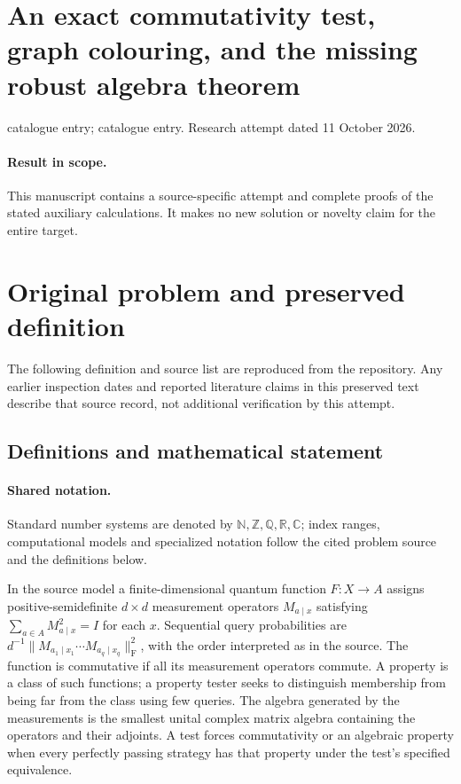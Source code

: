 \documentclass[11pt]{article}
\begin{document}
\section*{An exact commutativity test, graph colouring, and the missing robust algebra theorem}
\noindent catalogue entry; catalogue entry. Research attempt dated 11 October 2026.
\paragraph{Result in scope.}This manuscript contains a source-specific attempt and complete proofs of the stated auxiliary calculations. It makes no new solution or novelty claim for the entire target.
\section{Original problem and preserved definition}
The following definition and source list are reproduced from the repository. Any earlier inspection dates and reported literature claims in this preserved text describe that source record, not additional verification by this attempt.
\subsection{Definitions and mathematical statement}

\paragraph{Shared notation.}Standard number systems are denoted by $\mathbb N,\mathbb Z,\mathbb Q,\mathbb R,\mathbb C$; index ranges, computational models and specialized notation follow the cited problem source and the definitions below.


In the source model a finite-dimensional quantum function $F:X\to A$ assigns positive-semidefinite $d\times d$ measurement operators $M_{a\mid x}$ satisfying $\sum_{a\in A}M_{a\mid x}^2=I$ for each $x$. Sequential query probabilities are $d^{-1}\|M_{a_1\mid x_1}\cdots M_{a_q\mid x_q}\|_{\mathrm F}^2$, with the order interpreted as in the source. The function is commutative if all its measurement operators commute. A property is a class of such functions; a property tester seeks to distinguish membership from being far from the class using few queries. The algebra generated by the measurements is the smallest unital complex matrix algebra containing the operators and their adjoints. A test forces commutativity or an algebraic property when every perfectly passing strategy has that property under the test's specified equivalence.
\end{document}
